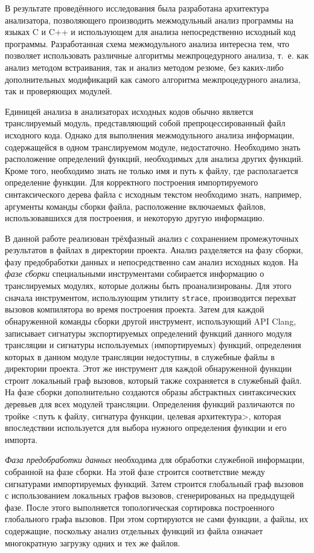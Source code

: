 В результате проведённого исследования была разработана архитектура анализатора, позволяющего производить межмодульный анализ программы на языках C и C++ и использующем для анализа непосредственно исходный код программы. Разработанная схема межмодульного анализа интересна тем, что позволяет использовать различные алгоритмы межпроцедурного анализа, т.~е. как анализ методом встраивания, так и анализ методом резюме, без каких-либо дополнительных модификаций как самого алгоритма межпроцедурного анализа, так и проверяющих модулей.

Единицей анализа в анализаторах исходных кодов обычно является транслируемый модуль, представляющий собой препроцессированный файл исходного кода. Однако для выполнения межмодульного анализа информации, содержащейся в одном транслируемом модуле, недостаточно. Необходимо знать расположение определений функций, необходимых для анализа других функций. Кроме того, необходимо знать не только имя и путь к файлу, где располагается определение функции. Для корректного построения импортируемого синтаксического дерева файла с исходным текстом необходимо знать, например, аргументы команды сборки файла, расположение включаемых файлов, использовавшихся для построения, и некоторую другую информацию.

В данной работе реализован трёхфазный анализ с сохранением промежуточных результатов в файлах в директории проекта. Анализ разделяется на фазу сборки, фазу предобработки данных и непосредственно сам анализ исходных кодов. На \textit{фазе сборки} специальными инструментами собирается информацию о транслируемых модулях, которые должны быть проанализированы. Для этого сначала инструментом, использующим утилиту \texttt{strace}, производится перехват вызовов компилятора во время построения проекта. Затем для каждой обнаруженной команды сборки другой инструмент, использующий API Clang, записывает сигнатуры экспортируемых определений функций данного модуля трансляции и сигнатуры используемых (импортируемых) функций, определения которых в данном модуле трансляции недоступны, в служебные файлы в директории проекта. Этот же инструмент для каждой обнаруженной функции строит локальный граф вызовов, который также сохраняется в служебный файл. На фазе сборки дополнительно создаются образы абстрактных синтаксических деревьев для всех модулей трансляции. Определения функций различаются по тройке <путь к файлу, сигнатура функции, целевая архитектура>, которая впоследствии используется для выбора нужного определения функции и его импорта.

\textit{Фаза предобработки данных} необходима для обработки служебной информации, собранной на фазе сборки. На этой фазе строится соответствие между сигнатурами импортируемых функций. Затем строится глобальный граф вызовов с использованием локальных графов вызовов, сгенерированых на предыдущей фазе. После этого выполняется топологическая сортировка построенного глобального графа вызовов. При этом сортируются не сами функции, а файлы, их содержащие, поскольку анализ отдельных функций из файла означает многократную загрузку одних и тех же файлов.

